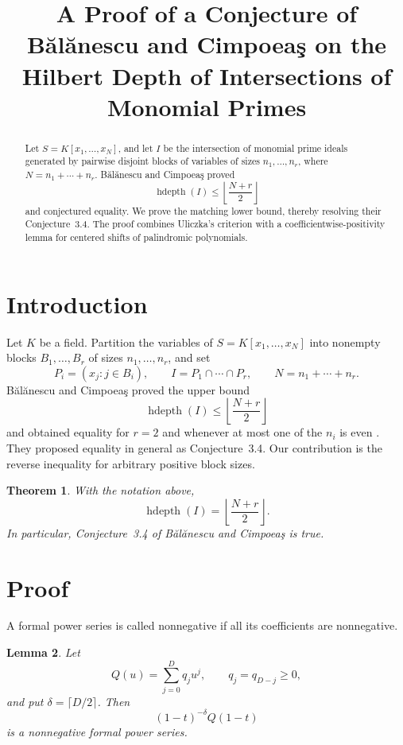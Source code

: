 \documentclass[11pt]{amsart}
\title[Hilbert depth of intersections of monomial primes]
{A Proof of a Conjecture of B\u{a}l\u{a}nescu and Cimpoea\c{s} on the
Hilbert Depth of Intersections of Monomial Primes}
\date{}
\newtheorem{theorem}{Theorem}
\newtheorem{lemma}[theorem]{Lemma}
\newcommand{\hdepth}{\operatorname{hdepth}}
\begin{document}
\begin{abstract}
Let $S=K[x_1,\ldots,x_N]$, and let $I$ be the intersection of monomial
prime ideals generated by pairwise disjoint blocks of variables of sizes
$n_1,\ldots,n_r$, where $N=n_1+\cdots+n_r$. B\u{a}l\u{a}nescu and
Cimpoea\c{s} proved
\[
\hdepth(I)\le \left\lfloor\frac{N+r}{2}\right\rfloor
\]
and conjectured equality. We prove the matching lower bound, thereby
resolving their Conjecture~3.4. The proof combines Uliczka's criterion
with a coefficientwise-positivity lemma for centered shifts of
palindromic polynomials.
\end{abstract}

\maketitle

\section{Introduction}

Let $K$ be a field. Partition the variables of
$S=K[x_1,\ldots,x_N]$ into nonempty blocks $B_1,\ldots,B_r$ of sizes
$n_1,\ldots,n_r$, and set
\[
P_i=(x_j:j\in B_i),
\qquad
I=P_1\cap\cdots\cap P_r,
\qquad
N=n_1+\cdots+n_r.
\]
B\u{a}l\u{a}nescu and Cimpoea\c{s} proved the upper bound
\[
\hdepth(I)\le \left\lfloor\frac{N+r}{2}\right\rfloor
\]
and obtained equality for $r=2$ and whenever at most one of the $n_i$ is
even \cite[Theorems~2.9 and~3.3]{BC}. They proposed equality in general
as Conjecture~3.4. Our contribution is the reverse inequality for
arbitrary positive block sizes.

\begin{theorem}\label{thm:main}
With the notation above,
\[
\hdepth(I)=\left\lfloor\frac{N+r}{2}\right\rfloor.
\]
In particular, Conjecture~3.4 of B\u{a}l\u{a}nescu and Cimpoea\c{s} is
true.
\end{theorem}

\section{Proof}

A formal power series is called nonnegative if all its coefficients are
nonnegative.

\begin{lemma}\label{lem:palindrome}
Let
\[
Q(u)=\sum_{j=0}^{D}q_j u^j,
\qquad q_j=q_{D-j}\ge 0,
\]
and put $\delta=\lceil D/2\rceil$. Then
\[
(1-t)^{-\delta}Q(1-t)
\]
is a nonnegative formal power series.
\end{lemma}
\end{document}
